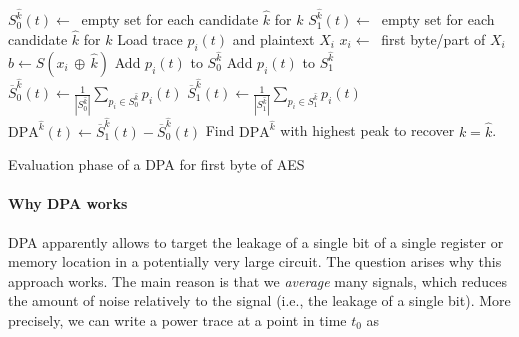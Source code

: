 \begin{algorithm}[h!tb]
\center
\begin{algorithmic}
\vspace{2mm}

\State $S_{0}^{\hat{k}}\left(t\right) \gets\ $  empty set for each candidate $\hat{k}$ for $k$
\State $S_{1}^{\hat{k}}\left(t\right) \gets\ $  empty set for each candidate $\hat{k}$ for $k$
\vspace{2mm}
	\vspace{1mm}
	\State Load trace $p_i\left(t\right)$ and plaintext $X_i$
	\State $x_i \gets\ $ first byte/part of $X_i$
	\vspace{1mm}
		\vspace{1mm}
		\State $b \gets S\left(x_i\,\oplus\,\hat{k}\right)$
			\State Add $p_i\left(t\right)$ to $S_{0}^{\hat{k}}$
		\Else
			\State Add $p_i\left(t\right)$ to $S_{1}^{\hat{k}}$
		\EndIf
	\EndFor
	\vspace{1mm}	
\EndFor
\vspace{2mm}
	\vspace{2mm}
	\State $\overline{S}_{0}^{\hat{k}}\left(t\right) \gets \frac{1}{\left|S_{0}^{\hat{k}}\right|} \sum_{p_i \in S_{0}^{\hat{k}}}{p_i\left(t\right) }$
	\State  $\overline{S}_{1}^{\hat{k}}\left(t\right) \gets \frac{1}{\left|S_{1}^{\hat{k}}\right|} \sum_{p_i \in S_{1}^{\hat{k}}}{p_i\left(t\right) }$
	\vspace{2mm}
	\State $\mbox{DPA}^{\hat{k}}\left(t\right) \gets \overline{S}_{1}^{\hat{k}}\left(t\right) - \overline{S}_{0}^{\hat{k}}\left(t\right)$
\vspace{2mm}
\EndFor
\vspace{2mm}
\State Find $\mbox{DPA}^{\hat{k}}$ with highest peak to recover $k = \hat{k}$.

\end{algorithmic}
\caption{Evaluation phase of a \ac{DPA} for first byte of \ac{AES}}
\label{alg:impl_attacks:dpa_eval}
\end{algorithm}

\paragraph{Why \acs{DPA} works}
\ac{DPA} apparently allows to target the leakage of a single bit of a single register or memory location in a potentially very large circuit. The question arises why this approach works. The main reason is that we \emph{average} many signals, which reduces the amount of noise relatively to the signal (i.e., the leakage of a single bit). More precisely, we can write a power trace at a point in time $t_0$ as 

